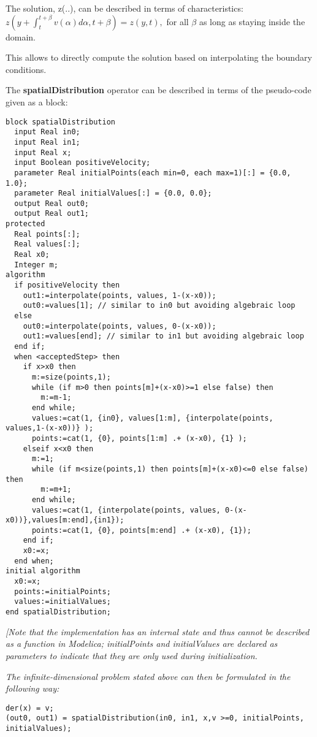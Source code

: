 The solution, z(..), can be described in terms of characteristics:\\
$z(y+\int_t^{t+\beta}v(\alpha)d\alpha,t+\beta)=z(y,t),$ for all $\beta$ as long as staying inside the domain.

This allows to directly compute the solution based on interpolating the
boundary conditions.

The \textbf{spatialDistribution} operator can be described in terms of
the pseudo-code given as a block:
\begin{lstlisting}[language=modelica]
block spatialDistribution
  input Real in0;
  input Real in1;
  input Real x;
  input Boolean positiveVelocity;
  parameter Real initialPoints(each min=0, each max=1)[:] = {0.0, 1.0};
  parameter Real initialValues[:] = {0.0, 0.0};
  output Real out0;
  output Real out1;
protected
  Real points[:];
  Real values[:];
  Real x0;
  Integer m;
algorithm
  if positiveVelocity then
    out1:=interpolate(points, values, 1-(x-x0));
    out0:=values[1]; // similar to in0 but avoiding algebraic loop
  else
    out0:=interpolate(points, values, 0-(x-x0));
    out1:=values[end]; // similar to in1 but avoiding algebraic loop
  end if;
  when <acceptedStep> then
    if x>x0 then
      m:=size(points,1);
      while (if m>0 then points[m]+(x-x0)>=1 else false) then
        m:=m-1;
      end while;
      values:=cat(1, {in0}, values[1:m], {interpolate(points, values,1-(x-x0))} );
      points:=cat(1, {0}, points[1:m] .+ (x-x0), {1} );
    elseif x<x0 then
      m:=1;
      while (if m<size(points,1) then points[m]+(x-x0)<=0 else false) then
        m:=m+1;
      end while;
      values:=cat(1, {interpolate(points, values, 0-(x-x0))},values[m:end],{in1});
      points:=cat(1, {0}, points[m:end] .+ (x-x0), {1});
    end if;
    x0:=x;
  end when;
initial algorithm
  x0:=x;
  points:=initialPoints;
  values:=initialValues;
end spatialDistribution;
\end{lstlisting}

\emph{{[}Note that the implementation has an internal state and thus
cannot be described as a function in Modelica; initialPoints and
initialValues are declared as parameters to indicate that they are only
used during initialization. }

\emph{The infinite-dimensional problem stated above can then be
formulated in the following way:}

\begin{lstlisting}[language=modelica]
der(x) = v;
(out0, out1) = spatialDistribution(in0, in1, x,v >=0, initialPoints, initialValues);
\end{lstlisting}

